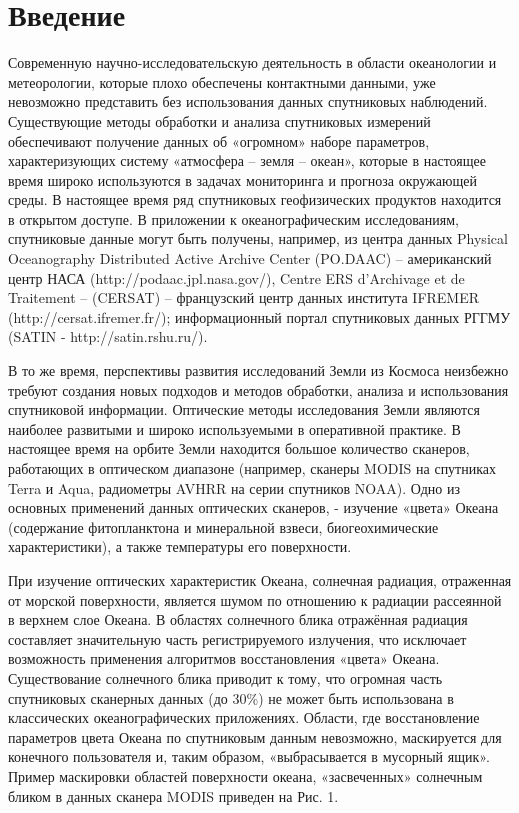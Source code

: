 \chapter*{Введение}							%


Современную научно-исследовательскую деятельность в области океанологии и метеорологии, которые плохо обеспечены контактными данными, уже невозможно представить без использования данных спутниковых наблюдений. Существующие методы обработки и анализа спутниковых измерений обеспечивают получение данных об «огромном» наборе параметров, характеризующих систему «атмосфера -- земля -- океан», которые в настоящее время широко используются в задачах мониторинга и прогноза окружающей среды. В настоящее время ряд спутниковых геофизических продуктов находится в открытом доступе. В приложении к океанографическим исследованиям, спутниковые данные могут быть получены, например, из центра данных Physical Oceanography Distributed Active Archive Center (PO.DAAC) -- американский центр НАСА (http://podaac.jpl.nasa.gov/), Centre ERS d'Archivage et de Traitement -- (CERSAT) -- французский центр данных института IFREMER (http://cersat.ifremer.fr/); информационный портал спутниковых данных РГГМУ (SATIN - http://satin.rshu.ru/).

В то же время, перспективы развития исследований Земли из Космоса неизбежно требуют создания новых подходов и методов обработки, анализа и использования спутниковой информации. Оптические методы исследования Земли являются наиболее развитыми и широко используемыми в оперативной практике. В настоящее время на орбите Земли находится большое количество сканеров, работающих в оптическом диапазоне (например, сканеры MODIS на спутниках Terra и Aqua, радиометры AVHRR на серии спутников NOAA). Одно из основных применений данных оптических сканеров, - изучение «цвета» Океана (содержание фитопланктона и минеральной взвеси, биогеохимические характеристики), а также температуры его поверхности.

При изучение оптических характеристик Океана, солнечная радиация, отраженная от морской поверхности, является шумом по отношению к радиации рассеянной в верхнем слое Океана. В областях солнечного блика отражённая радиация составляет значительную часть регистрируемого излучения, что исключает возможность применения алгоритмов восстановления «цвета» Океана. Существование солнечного блика приводит к тому, что огромная часть спутниковых сканерных данных (до 30\%) не может быть использована в классических океанографических приложениях. Области, где восстановление параметров цвета Океана по спутниковым данным невозможно, маскируется для конечного пользователя и, таким образом, «выбрасывается в мусорный ящик». Пример маскировки областей поверхности океана, «засвеченных» солнечным бликом в данных сканера MODIS приведен на Рис. 1.



